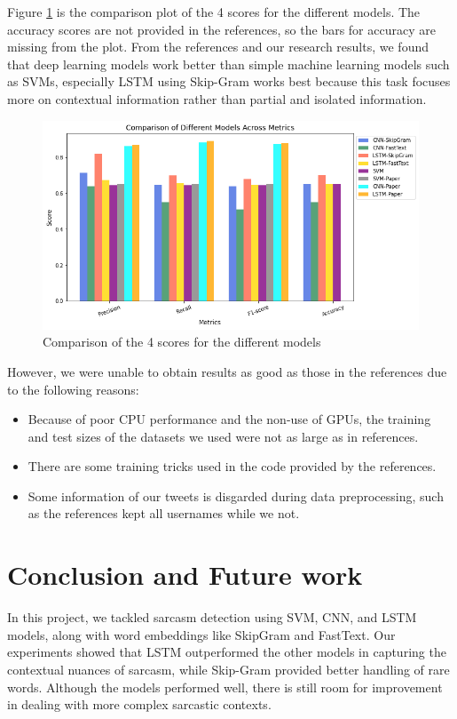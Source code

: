 \documentclass[11pt]{article}
\begin{document}
Figure \ref{fig:comp} is the comparison plot of the 4 scores for the different models. The accuracy scores are not provided in the references, so the bars for accuracy are missing from the plot. From the references and our research results, we found that deep learning models work better than simple machine learning models such as SVMs, especially LSTM using Skip-Gram works best because this task focuses more on contextual information rather than partial and isolated information.
\begin{figure}[htbp]
    \centering
    \includegraphics[width=\linewidth]{pic/Comparison.png}
    \caption{Comparison of the 4 scores for the different models}
    \label{fig:comp}
\end{figure}

However, we were unable to obtain results as good as those in the references due to the following reasons:
\begin{itemize}
    \item Because of poor CPU performance and the non-use of GPUs, the training and test sizes of the datasets we used were not as large as in references.
    \item There are some training tricks used in the code provided by the references.
    \item Some information of our tweets is disgarded during data preprocessing, such as the references kept all usernames while we not.
\end{itemize}

\section{Conclusion and Future work}
In this project, we tackled sarcasm detection using SVM, CNN, and LSTM models, along with word embeddings like SkipGram and FastText. Our experiments showed that LSTM outperformed the other models in capturing the contextual nuances of sarcasm, while Skip-Gram provided better handling of rare words. Although the models performed well, there is still room for improvement in dealing with more complex sarcastic contexts.
\end{document}
